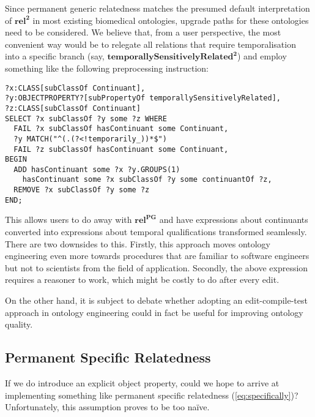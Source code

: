 \documentclass{ao2e}
\newcommand{\mirel}[1]{\ensuremath{\mathrm{\mathbf{#1}}}}
\newcommand{\mrel}[2]{\mirel{#1^#2}}
\newcommand{\mrelb}[1]{\mrel{#1}{2}}
\newcommand{\mrelpg}[1]{\mrel{#1}{{PG}}}
\begin{document}
Since permanent generic relatedness matches the presumed default interpretation
of \mrelb{rel} in most existing biomedical ontologies, upgrade paths for these
ontologies need to be considered. We believe that, from a user perspective, the
most convenient way would be to relegate all relations that require
temporalisation into a specific branch (say,
\mrelb{temporallySensitivelyRelated}) and employ something like the following 
preprocessing instruction:
\begin{lstlisting}
?x:CLASS[subClassOf Continuant],
?y:OBJECTPROPERTY?[subPropertyOf temporallySensitivelyRelated],
?z:CLASS[subClassOf Continuant] 
SELECT ?x subClassOf ?y some ?z WHERE 
  FAIL ?x subClassOf hasContinuant some Continuant,
  ?y MATCH("^(.(?<!temporarily_))*$")
  FAIL ?z subClassOf hasContinuant some Continuant,
BEGIN
  ADD hasContinuant some ?x ?y.GROUPS(1) 
    hasContinuant some ?x subClassOf ?y some continuantOf ?z,
  REMOVE ?x subClassOf ?y some ?z
END;
\end{lstlisting}
This allows users to do away with \mrelpg{rel} and have expressions about
continuants converted into expressions about temporal qualifications transformed
seamlessly. There are two downsides to this. Firstly, this approach moves
ontology engineering even more towards procedures that are familiar to
software engineers but not to scientists from the field of application.
Secondly, the above expression requires a reasoner to work, which might be
costly to do after every edit.

On the other hand, it is subject to debate whether adopting an edit-compile-test
approach in ontology engineering could in fact be useful for improving ontology quality.
\subsection{Permanent Specific Relatedness}
If we do introduce an explicit object property, could we hope to arrive at
implementing something like permanent specific relatedness
(\ref{eq:specifically})? Unfortunately, this assumption proves to be too naïve.
\end{document}
